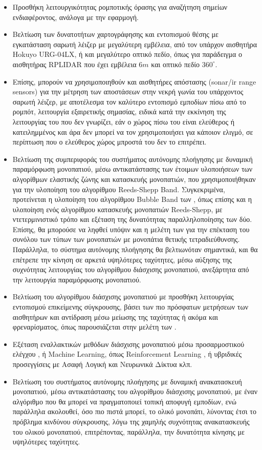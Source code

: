 \begin{itemize}
	\item Προσθήκη λειτουργικότητας ρομποτικής όρασης για αναζήτηση σημείων ενδιαφέροντος, ανάλογα με την εφαρμογή.
	\item Βελτίωση των δυνατοτήτων χαρτογράφησης και εντοπισμού θέσης με εγκατάσταση σαρωτή λέιζερ με μεγαλύτερη εμβέλεια, από τον υπάρχον αισθητήρα Hokuyo URG-04LX, ή και μεγαλύτερο οπτικό πεδίο, όπως για παράδειγμα ο αισθητήρας RPLIDAR που έχει εμβέλεια $6m$ και οπτικό πεδίο $360^\circ$.
	\item Επίσης, μπορούν να χρησιμοποιηθούν και αισθητήρες απόστασης (sonar/ir range sensors) για την μέτρηση των αποστάσεων στην νεκρή γωνία του υπάρχοντος σαρωτή λέιζερ, με αποτέλεσμα τον καλύτερο εντοπισμό εμποδίων πίσω από το ρομπότ, λειτουργία εξαιρετικής σημασίας, ειδικά κατά την εκκίνηση της λειτουργίας του που δεν γνωρίζει, εάν ο χώρος πίσω του είναι ελεύθερος ή κατειλημμένος και άρα δεν μπορεί να τον χρησιμοποιήσει για κάποιον ελιγμό, σε περίπτωση που ο ελεύθερος χώρος μπροστά του δεν το επιτρέπει.
	\item Βελτίωση της συμπεριφοράς του συστήματος αυτόνομης πλοήγησης με δυναμική παραμόρφωση μονοπατιού, μέσω αντικατάστασης των έτοιμων υλοποιήσεων των αλγορίθμων ελαστικής ζώνης και κατασκευής μονοπατιών, που χρησιμοποιήθηκαν για την υλοποίηση του αλγορίθμου Reeds-Shepp Band. Συγκεκριμένα, προτείνεται η υλοποίηση του αλγορίθμου Bubble Band των \citeauthor{dpm} \cite{dpm}, όπως επίσης και η υλοποίηση ενός αλγορίθμου κατασκευής μονοπατιών Reeds-Shepp, με ντετερμινιστικό τρόπο και εξέταση της δυνατότητας παραλληλοποίησης των δύο. Επίσης, θα μπορούσε να ληφθεί υπόψιν και η μελέτη των \citeauthor{reeds_shepp_4ws} \cite{reeds_shepp_4ws} για την επέκταση του συνόλου των τύπων των μονοπατιών με μονοπάτια θετικής τετραδιεύθυνσης. Παράλληλα, το σύστημα αυτόνομης πλοήγησης θα βελτιωνόταν σημαντικά, και θα επέτρεπε την κίνηση σε αρκετά υψηλότερες ταχύτητες, μέσω αύξησης της συχνότητας λειτουργίας του αλγορίθμου διάσχισης μονοπατιού, ανεξάρτητα από την λειτουργία παραμόρφωσης μονοπατιού.
	\item Βελτίωση του αλγορίθμου διάσχισης μονοπατιού με προσθήκη λειτουργίας εντοπισμού επικείμενης σύγκρουσης, βάσει των πιο πρόσφατων μετρήσεων των αισθητήρων και αντίδραση μέσω μείωσης της ταχύτητας ή ακόμα και φρεναρίσματος, όπως παρουσιάζεται στην μελέτη των \citeauthor{reactive_fuzzy_ptc} \cite{reactive_fuzzy_ptc}.
	\item Εξέταση εναλλακτικών μεθόδων διάσχισης μονοπατιού μέσω προσαρμοστικού ελέγχου \cite{offroad_adaptive_control}, ή Machine Learning, όπως Reinforcement Learning \cite{rl_ptc}, ή υβριδικές προσεγγίσεις με Ασαφή Λογική και Νευρωνικά Δίκτυα \cite{neural_and_fuzzy_navigation} κλπ.
	\item Βελτίωση του συστήματος αυτόνομης πλοήγησης με δυναμική ανακατασκευή μονοπατιού, μέσω αντικατάστασης του αλγορίθμου διάσχισης μονοπατιού, με έναν αλγόριθμο που θα μπορεί να πραγματοποιεί τοπική αποφυγή εμποδίων, ενώ παράλληλα ακολουθεί, όσο πιο πιστά μπορεί, το ολικό μονοπάτι, λύνοντας έτσι το πρόβλημα κινδύνου σύγκρουσης, λόγω της χαμηλής συχνότητας ανακατασκευής του ολικού μονοπατιού, επιτρέποντας, παράλληλα, την δυνατότητα κίνησης με υψηλότερες ταχύτητες.
\end{itemize}
